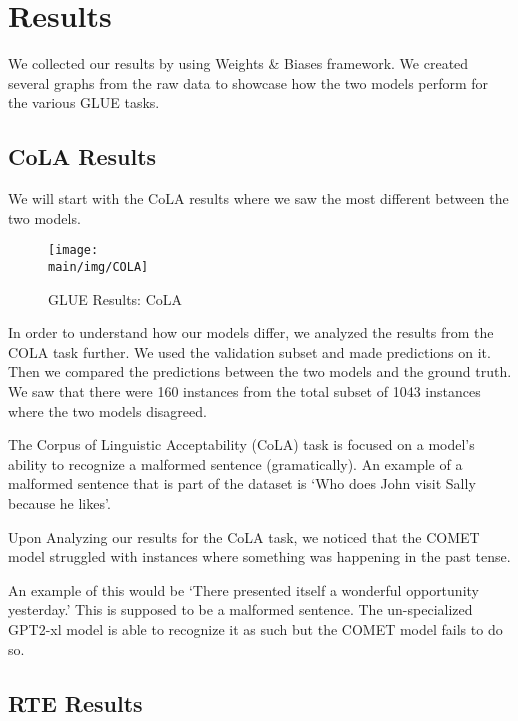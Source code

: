\documentclass[\main/thesis.tex]{subfiles}
\begin{document}
\chapter{Results}

We collected our results by using Weights \& Biases framework. We created several
graphs from the raw data to showcase how the two models perform for the various GLUE tasks. 


\section{CoLA Results}\label{sec:cola_results}

We will start with the CoLA results where we saw the most different between the two models. 

\begin{figure}
    \centering
    \texttt{[image: \\main/img/COLA]}
    \caption[GLUE Results: CoLA] {GLUE Results: CoLA}
    \label{fig:cola_fig}
\end{figure}


In order to understand how our models differ, we analyzed the results from the COLA task further. 
We used the validation subset and made predictions on it. Then we compared the predictions between
the two models and the ground truth. We saw that there were 160 instances from the total 
subset of 1043 instances where the two models disagreed. 

The Corpus of Linguistic Acceptability (CoLA) task is focused on a model's ability 
to recognize a malformed sentence (gramatically). An example of a malformed sentence that is 
part of the dataset is `Who does John visit Sally because he likes'. 

Upon Analyzing our results for the CoLA task, we noticed that the COMET 
model struggled with instances where something was happening in the past tense.

An example of this would be `There presented itself a wonderful opportunity yesterday.' 
This is supposed to be a malformed sentence. The un-specialized GPT2-xl model is able to 
recognize it as such but the COMET model fails to do so. 

\section{RTE Results}\label{sec:rte_results}
\end{document}
